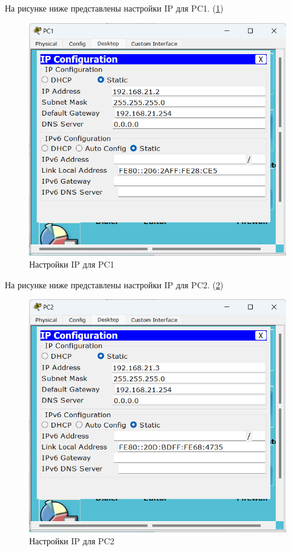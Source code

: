 \documentclass[14pt]{extarticle}
\begin{document}
На рисунке ниже представлены настройки IP для PC1. (\ref{img:PC1})

\begin{figure}[H]
    \centering
    \includegraphics[width=1.0\linewidth]{PC1.png}
    \caption{Настройки IP для PC1\label{img:PC1}}
\end{figure}

На рисунке ниже представлены настройки IP для PC2. (\ref{img:PC2})

\begin{figure}[H]
    \centering
    \includegraphics[width=1.0\linewidth]{PC2.png}
    \caption{Настройки IP для PC2\label{img:PC2}}
\end{figure}
\end{document}
